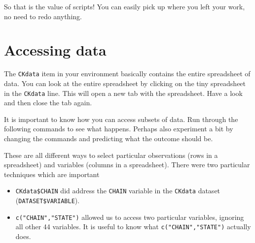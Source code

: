 \documentclass[
]{article}
\newenvironment{Shaded}{\begin{snugshade}}{\end{snugshade}}
\newcommand{\DecValTok}[1]{\textcolor[rgb]{0.00,0.00,0.81}{#1}}
\newcommand{\FunctionTok}[1]{\textcolor[rgb]{0.13,0.29,0.53}{\textbf{#1}}}
\newcommand{\NormalTok}[1]{#1}
\newcommand{\SpecialCharTok}[1]{\textcolor[rgb]{0.81,0.36,0.00}{\textbf{#1}}}
\newcommand{\StringTok}[1]{\textcolor[rgb]{0.31,0.60,0.02}{#1}}
\providecommand{\tightlist}{%
  \setlength{\itemsep}{0pt}\setlength{\parskip}{0pt}}
\begin{document}
So that is the value of scripts! You can easily pick up where you left
your work, no need to redo anything.

\hypertarget{accessing-data}{%
\section{Accessing data}\label{accessing-data}}

The \texttt{CKdata} item in your environment basically contains the
entire spreadsheet of data. You can look at the entire spreadsheet by
clicking on the tiny spreadsheet in the \texttt{CKdata} line. This will
open a new tab with the spreadsheet. Have a look and then close the tab
again.

It is important to know how you can access subsets of data. Run through
the following commands to see what happens. Perhaps also experiment a
bit by changing the commands and predicting what the outcome should be.

\begin{Shaded}
\end{Shaded}

These are all different ways to select particular observations (rows in
a spreadsheet) and variables (columns in a spreadsheet). There were two
particular techniques which are important

\begin{itemize}
\tightlist
\item
  \texttt{CKdata\$CHAIN} did address the \texttt{CHAIN} variable in the
  \texttt{CKdata} dataset (\texttt{DATASET\$VARIABLE}).
\item
  \texttt{c("CHAIN","STATE")} allowed us to access two particular
  variables, ignoring all other 44 variables. It is useful to know what
  \texttt{c("CHAIN","STATE")} actually does.
\end{itemize}
\end{document}
